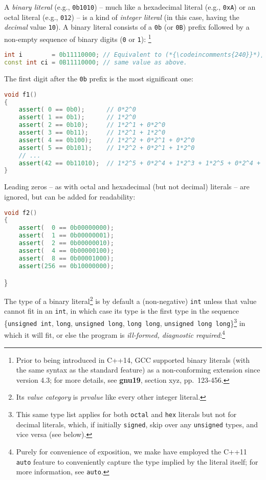 \documentclass[twoside,10pt,letterpaper,usenames]{newstyle-PearsonGeneric-7-38}
\newcommand{\codeincomments}{\color{skyblue}\ttfamily}
\begin{document}
A \emph{binary literal} (e.g., \texttt{0b1010}) -- much like a
hexadecimal literal (e.g., \texttt{0xA}) or an octal literal (e.g.,
\texttt{012}) -- is a kind of \emph{integer literal} (in this case,
having the \emph{decimal} value \texttt{10}). A binary literal consists
of a \texttt{0b} (or \texttt{0B}) prefix followed by a non-empty
sequence of binary digits (\texttt{0} or \texttt{1}):
{\cprotect\footnote{Prior to being introduced in C++14, GCC supported
binary literals (with the same syntax as the standard feature) as a
non-conforming extension since version 4.3; for more details, see
\textbf{gnu19}, section xyz, pp.~123-456.}}

\begin{lstlisting}[language=C++]
int i        = 0b11110000; // Equivalent to (*{\codeincomments{240}}*), (*{\codeincomments{0360}}*), or (*{\codeincomments{0xF0}}*)
const int ci = 0B11110000; // same value as above.
\end{lstlisting}
    

The first digit after the \texttt{0b} prefix is the most significant
one:

\begin{lstlisting}[language=C++]
void f1()
{
    assert( 0 == 0b0);      // 0*2^0
    assert( 1 == 0b1);      // 1*2^0
    assert( 2 == 0b10);     // 1*2^1 + 0*2^0
    assert( 3 == 0b11);     // 1*2^1 + 1*2^0
    assert( 4 == 0b100);    // 1*2^2 + 0*2^1 + 0*2^0
    assert( 5 == 0b101);    // 1*2^2 + 0*2^1 + 1*2^0
    // ...
    assert(42 == 0b11010);  // 1*2^5 + 0*2^4 + 1*2^3 + 1*2^5 + 0*2^4 + 1*2^3
}
\end{lstlisting}
    

Leading zeros -- as with octal and hexadecimal (but not decimal)
literals -- are ignored, but can be added for readability:

\begin{lstlisting}[language=C++]
void f2()
{
    assert(  0 == 0b00000000);
    assert(  1 == 0b00000001);
    assert(  2 == 0b00000010);
    assert(  4 == 0b00000100);
    assert(  8 == 0b00001000);
    assert(256 == 0b10000000);
\end{lstlisting}
    

\}

The type of a binary literal{\cprotect\footnote{Its \emph{value
category} is \emph{prvalue} like every other integer literal.}} is by
default a (non-negative) \texttt{int} unless that value cannot fit in an
\texttt{int}, in which case its type is the first type in the sequence
\{\texttt{unsigned int}, \texttt{long}, \texttt{unsigned long},
\texttt{long long}, \texttt{unsigned long long}\}{\cprotect\footnote{This
same type list applies for both \texttt{octal} and \texttt{hex}
literals but not for decimal literals, which, if initially
\texttt{signed}, skip over any \texttt{unsigned} types, and vice versa
(see below).}} in which it will fit, or else the program is
\emph{ill-formed, diagnostic required}:{\cprotect\footnote{Purely for
convenience of exposition, we make have employed the C++11
\texttt{auto} feature to conveniently capture the type implied by the
literal itself; for more information, see \texttt{auto}.}}
\end{document}
